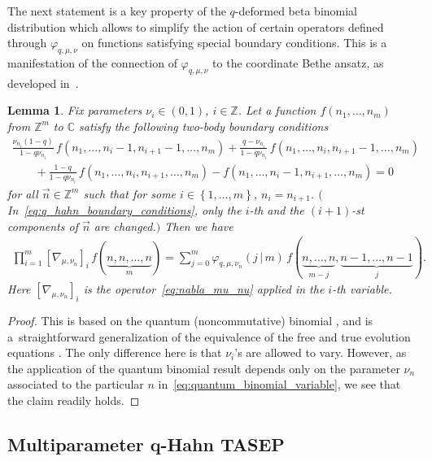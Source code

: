 \documentclass[11pt]{article}
\numberwithin{equation}{section}
\numberwithin{equation}{section}
\newtheorem{Lemma}[Theorem]{Lemma}
\begin{document}
The next statement is a key property of the $q$-deformed beta binomial distribution
which allows to simplify the action of certain operators defined through $\varphi_{q,\mu,\nu}$
on functions satisfying special boundary conditions. This is a manifestation of the
connection of $\varphi_{q,\mu,\nu}$ to the coordinate Bethe ansatz, as
developed in~\cite{Povolotsky2013}.
\begin{Lemma}
	\label{lemma:phi_duality}
	Fix parameters $\nu_i\in(0,1)$, $i\in \mathbb{Z}$.
	Let a function $f(n_1,\ldots,n_m )$ from
	$\mathbb{Z}^{m}$ to $\mathbb{C}$ satisfy the following
	two-body
	boundary conditions
\begin{gather}
\frac{\nu_{n_i}(1-q)}{1-q\nu_{n_i}}\,f(n_1,\ldots,n_{i}-1,n_{i+1}-1,\ldots ,n_m)
+\frac{q-\nu_{n_i}}{1-q\nu_{n_i}}\,f(n_1,\ldots,n_i,n_{i+1}-1,\ldots ,n_m)\nonumber
\\ \qquad
{}	+\frac{1-q}{1-q\nu_{n_i}}\,f(n_1,\ldots,n_i,n_{i+1},\ldots ,n_m)
-f(n_1,\ldots,n_i-1,n_{i+1},\ldots ,n_m)=0
		\label{eq:q_hahn_boundary_conditions}
		\end{gather}
	for all $\vec n\in \mathbb{Z}^m$
	such that for some $i \in \left\{ 1,\ldots,m \right\}$,
	$n_i=n_{i+1}$. $($In~\eqref{eq:q_hahn_boundary_conditions},
	only the $i$-th and the $(i+1)$-st components of $\vec n$
	are changed.$)$ Then we have
	\begin{gather}
		\label{eq:quantum_binomial_variable}
		\prod_{i=1}^{m}[\nabla_{\mu,\nu_{n}}]_i \,
		f(\underbrace{n,n,\ldots,n}_m)
		=
		\sum_{j=0}^{m}
		\varphi_{q,\mu,\nu_{n}}(j\,|\, m)\,
		f(\underbrace{n,\ldots,n }_{m-j},\underbrace{n-1,\ldots,n-1 }_{j}).
	\end{gather}
	Here $[\nabla_{\mu,\nu_{n}}]_i$ is the operator~\eqref{eq:nabla_mu_nu}
	applied in the $i$-th variable.
\end{Lemma}
\begin{proof}
	This is based on the quantum (noncommutative) binomial
	\cite[Theorem 1]{Povolotsky2013}, and is a~straightforward generalization of the
	equivalence of the free and true evolution equations
	\cite[Proposition 1.8]{Corwin2014qmunu}.
	The only difference here is that $\nu_i$'s are allowed to vary.
	However, as the application of the quantum binomial
	result depends only on the parameter $\nu_n$ associated
	to the particular $n$ in~\eqref{eq:quantum_binomial_variable},
	we see that the claim readily holds.
\end{proof}


\subsection[Multiparameter q-Hahn TASEP]
{Multiparameter $\boldsymbol q$-Hahn TASEP}\label{sub:qhahn_defn}
\end{document}
